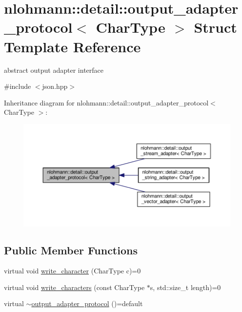 \hypertarget{structnlohmann_1_1detail_1_1output__adapter__protocol}{}\section{nlohmann\+:\+:detail\+:\+:output\+\_\+adapter\+\_\+protocol$<$ Char\+Type $>$ Struct Template Reference}
\label{structnlohmann_1_1detail_1_1output__adapter__protocol}


abstract output adapter interface  




{\ttfamily \#include $<$json.\+hpp$>$}



Inheritance diagram for nlohmann\+:\+:detail\+:\+:output\+\_\+adapter\+\_\+protocol$<$ Char\+Type $>$\+:\nopagebreak
\begin{figure}[H]
\begin{center}
\leavevmode
\includegraphics[width=350pt]{structnlohmann_1_1detail_1_1output__adapter__protocol__inherit__graph}
\end{center}
\end{figure}
\subsection*{Public Member Functions}
\begin{DoxyCompactItemize}
\item 
virtual void \hyperlink{structnlohmann_1_1detail_1_1output__adapter__protocol_a3381896fe1be557f591de2e917cdc7d5}{write\+\_\+character} (Char\+Type c)=0
\item 
virtual void \hyperlink{structnlohmann_1_1detail_1_1output__adapter__protocol_a2f410a164e0eda17cf6561114b0eee4a}{write\+\_\+characters} (const Char\+Type $\ast$s, std\+::size\+\_\+t length)=0
\item 
virtual \hyperlink{structnlohmann_1_1detail_1_1output__adapter__protocol_ad71cdc057030f8a775a191face25061a}{$\sim$output\+\_\+adapter\+\_\+protocol} ()=default
\end{DoxyCompactItemize}


